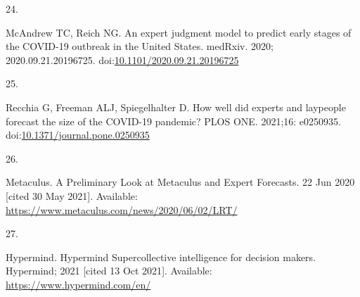\documentclass[10pt,letterpaper]{article} %
\newlength{\cslhangindent}
\newlength{\csllabelwidth}
\newlength{\cslentryspacingunit} %
\newenvironment{CSLReferences}[2] %
 {%
  \setlength{\parindent}{0pt}
  \ifodd #1
  \let\oldpar\par
  \def\par{\hangindent=\cslhangindent\oldpar}
  \fi
  \setlength{\parskip}{#2\cslentryspacingunit}
 }%
 {}
\newcommand{\CSLLeftMargin}[1]{\parbox[t]{\csllabelwidth}{#1}}
\newcommand{\CSLRightInline}[1]{\parbox[t]{\linewidth - \csllabelwidth}{#1}\break}
\providecommand{\DIFaddbegin}{} %
\providecommand{\DIFaddend}{} %
\providecommand{\DIFdelbegin}{} %
\providecommand{\DIFdelend}{} %
\newcommand{\DIFscaledelfig}{0.5}
\newlength{\DIFdelgraphicswidth} %
\newlength{\DIFdelgraphicsheight} %
\newcommand{\DIFaddincludegraphics}[2][]{{\color{blue}\fbox{\DIFOincludegraphics[#1]{#2}}}} %
\newcommand{\DIFdelincludegraphics}[2][]{%
\sbox{\DIFdelgraphicsbox}{\DIFOincludegraphics[#1]{#2}}%
\settoboxwidth{\DIFdelgraphicswidth}{\DIFdelgraphicsbox} %
\settoboxtotalheight{\DIFdelgraphicsheight}{\DIFdelgraphicsbox} %
\scalebox{\DIFscaledelfig}{%
\parbox[b]{\DIFdelgraphicswidth}{\usebox{\DIFdelgraphicsbox}\\[-\baselineskip] \rule{\DIFdelgraphicswidth}{0em}}\llap{\resizebox{\DIFdelgraphicswidth}{\DIFdelgraphicsheight}{%
\setlength{\unitlength}{\DIFdelgraphicswidth}%
\begin{picture}(1,1)%
\thicklines\linethickness{2pt} %
{\color[rgb]{1,0,0}\put(0,0){\framebox(1,1){}}}%
{\color[rgb]{1,0,0}\put(0,0){\line( 1,1){1}}}%
{\color[rgb]{1,0,0}\put(0,1){\line(1,-1){1}}}%
\end{picture}%
}\hspace*{3pt}}} %
} %
\DeclareRobustCommand{\DIFaddbegin}{\DIFOaddbegin \let\includegraphics\DIFaddincludegraphics} %
\DeclareRobustCommand{\DIFaddend}{\DIFOaddend \let\includegraphics\DIFOincludegraphics} %
\DeclareRobustCommand{\DIFdelbegin}{\DIFOdelbegin \let\includegraphics\DIFdelincludegraphics} %
\DeclareRobustCommand{\DIFdelend}{\DIFOaddend \let\includegraphics\DIFOincludegraphics} %
\begin{document}
\begin{CSLReferences}{0}{0}
\leavevmode{}%
\CSLLeftMargin{24. }
\DIFdelbegin %
\DIFdelend \DIFaddbegin \CSLRightInline{McAndrew TC, Reich NG. An expert judgment model to
predict early stages of the {COVID-19} outbreak in the {United States}.
medRxiv. 2020; 2020.09.21.20196725.
doi:\href{https://doi.org/10.1101/2020.09.21.20196725}{10.1101/2020.09.21.20196725}}
\DIFaddend 

\leavevmode{}%
\CSLLeftMargin{25. }
\DIFdelbegin %
\DIFdelend \DIFaddbegin \CSLRightInline{Recchia G, Freeman ALJ, Spiegelhalter D. How well did
experts and laypeople forecast the size of the {COVID-19} pandemic? PLOS
ONE. 2021;16: e0250935.
doi:\href{https://doi.org/10.1371/journal.pone.0250935}{10.1371/journal.pone.0250935}}
\DIFaddend 

\leavevmode{}%
\CSLLeftMargin{26. }
\DIFdelbegin %
\DIFdelend \DIFaddbegin \CSLRightInline{Metaculus. A {Preliminary Look} at {Metaculus} and
{Expert Forecasts}. 22 Jun 2020 {[}cited 30 May 2021{]}. Available:
\url{https://www.metaculus.com/news/2020/06/02/LRT/}}
\DIFaddend 

\leavevmode{}%
\CSLLeftMargin{27. }
\DIFdelbegin %
\DIFdelend \DIFaddbegin \CSLRightInline{Hypermind. Hypermind \textbar{} {Supercollective}
intelligence for decision makers. {Hypermind}; 2021 {[}cited 13 Oct
2021{]}. Available: \url{https://www.hypermind.com/en/}}
\DIFaddend 


\end{CSLReferences}
\end{document}
